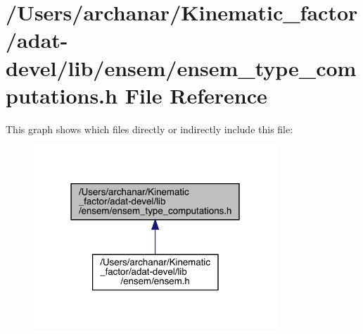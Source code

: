 \hypertarget{adat-devel_2lib_2ensem_2ensem__type__computations_8h}{}\section{/\+Users/archanar/\+Kinematic\+\_\+factor/adat-\/devel/lib/ensem/ensem\+\_\+type\+\_\+computations.h File Reference}
\label{adat-devel_2lib_2ensem_2ensem__type__computations_8h}
This graph shows which files directly or indirectly include this file\+:
\nopagebreak
\begin{figure}[H]
\begin{center}
\leavevmode
\includegraphics[width=259pt]{d5/d33/adat-devel_2lib_2ensem_2ensem__type__computations_8h__dep__incl}
\end{center}
\end{figure}
